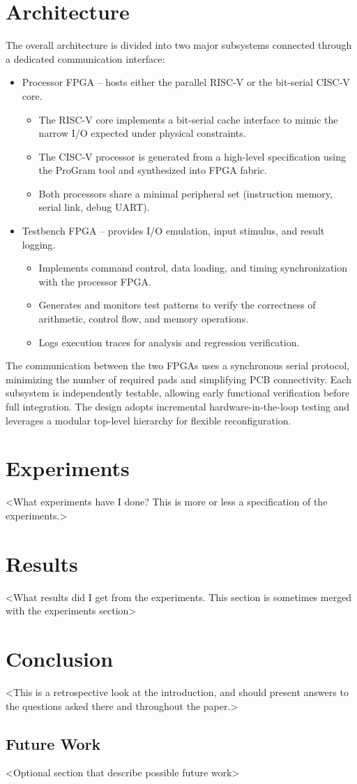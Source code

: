 \documentclass[10pt,twocolumn]{article}
\begin{document}
\section{Architecture}
The overall architecture is divided into two major subsystems connected through a dedicated communication interface:
\begin{itemize}
\item Processor FPGA – hosts either the parallel RISC-V or the bit-serial CISC-V core.
\begin{itemize}
    \item The RISC-V core implements a bit-serial cache interface to mimic the narrow I/O expected under physical constraints.
    \item The CISC-V processor is generated from a high-level specification using the ProGram tool and synthesized into FPGA fabric.
    \item Both processors share a minimal peripheral set (instruction memory, serial link, debug UART).
\end{itemize}
\item Testbench FPGA – provides I/O emulation, input stimulus, and result logging.
\begin{itemize}
    \item Implements command control, data loading, and timing synchronization with the processor FPGA.
    \item Generates and monitors test patterns to verify the correctness of arithmetic, control flow, and memory operations.
    \item Logs execution traces for analysis and regression verification.
\end{itemize}
\end{itemize}
The communication between the two FPGAs uses a synchronous serial protocol, minimizing the number of required pads and simplifying PCB connectivity. Each subsystem is independently testable, allowing early functional verification before full integration. The design adopts incremental hardware-in-the-loop testing and leverages a modular top-level hierarchy for flexible reconfiguration.

\section{Experiments}
<What experiments have I done? This is more or less a specification of the experiments.>

\section{Results}
<What results did I get from the experiments. This section is sometimes merged with the experiments section>

\section{Conclusion}
<This is a retrospective look at the introduction, and should present answers to the questions asked there and throughout the paper.>

\subsection{Future Work}
<Optional section that describe possible future work>



\end{document}
